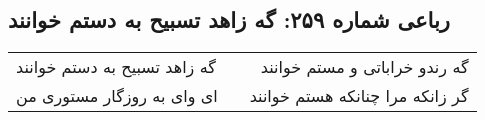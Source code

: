 \begin{center}
\section*{رباعی شماره ۲۵۹: گه زاهد تسبیح به دستم خوانند}
\label{sec:sh259}
\begin{longtable}{l p{0.5cm} r}
گه زاهد تسبیح به دستم خوانند
&&
گه رندو خراباتی و مستم خوانند
\\
ای وای به روزگار مستوری من
&&
گر زانکه مرا چنانکه هستم خوانند
\\
\end{longtable}
\end{center}

